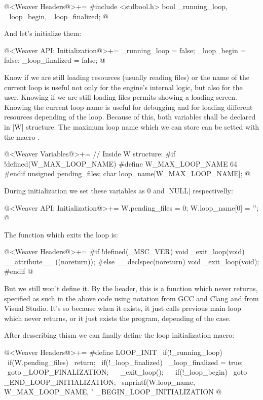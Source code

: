 \iniciocodigo
@<Weaver Headers@>+=
#include <stdbool.h>
bool _running_loop, _loop_begin, _loop_finalized;
@
\fimcodigo

And let's initialize them:

\iniciocodigo
@<Weaver API: Initialization@>+=
_running_loop = false;
_loop_begin = false;
_loop_finalized = false;
@
\fimcodigo

Know if we are still loading resources (usually reading files) or the
name of the current loop is useful not only for the engine's internal
logic, but also for the user. Knowing if we are still loading files
permits showing a loading screen. Knowing the current loop name is
useful for debugging and for loading different resources depending of
the loop. Because of this, both variables shall be declared in |W|
structure. The maximum loop name which we can store can be setted with
the macro .

\iniciocodigo
@<Weaver Variables@>+=
// Inside W structure:
#if !defined(W_MAX_LOOP_NAME)
#define W_MAX_LOOP_NAME 64
#endif
unsigned pending_files;
char loop_name[W_MAX_LOOP_NAME];
@
\fimcodigo

During initialization we set these variables as 0 and |NULL|
respectivelly:

\iniciocodigo
@<Weaver API: Initialization@>+=
W.pending_files = 0;
W.loop_name[0] = '\0';
@
\fimcodigo

The function which exits the loop is:


\iniciocodigo
@<Weaver Headers@>+=
#if !defined(_MSC_VER)
void _exit_loop(void) __attribute__ ((noreturn));
#else
__declspec(noreturn) void _exit_loop(void);
#endif
@
\fimcodigo

But we still won't define it. By the header, this is a function which
never returns, specified as such in the above code using notation from
GCC and Clang and from Visual Studio. It's so because when it exists,
it just calls previous main loop which never returns, or it just
exists the program, depending of the case.

After desscribing thism we can finally define the loop initialization
macro:

\iniciocodigo
@<Weaver Headers@>+=
#define LOOP_INIT                                                   \
  if(!_running_loop){                                               \
    if(W.pending_files)                                             \
      return;                                                       \
    if(!_loop_finalized){                                           \
      _loop_finalized = true;                                       \
      goto _LOOP_FINALIZATION;                                      \
    }                                                              \
    _exit_loop();                                                   \
  }                                                                 \
  if(!_loop_begin)                                                   \
    goto _END_LOOP_INITIALIZATION;                                   \
  snprintf(W.loop_name, W_MAX_LOOP_NAME, "%
  _BEGIN_LOOP_INITIALIZATION
@
\fimcodigo

